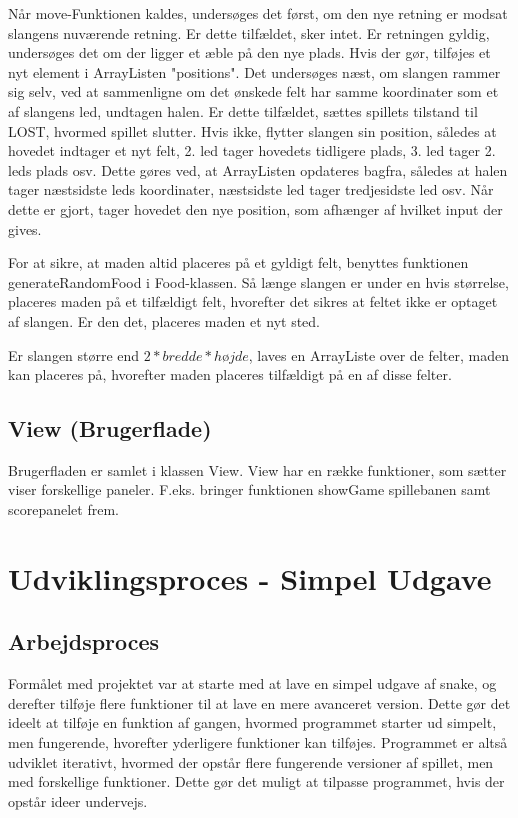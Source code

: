 \documentclass{report}
\begin{document}
Når move-Funktionen kaldes, undersøges det først, om den nye retning er modsat slangens nuværende retning. Er dette tilfældet, sker intet. Er retningen gyldig, undersøges det om der ligger et æble på den nye plads. Hvis der gør, tilføjes et nyt element i ArrayListen "positions". 
Det undersøges næst, om slangen rammer sig selv, ved at sammenligne om det ønskede felt har samme koordinater som et af slangens led, undtagen halen. Er dette tilfældet, sættes spillets tilstand til LOST, hvormed spillet slutter. Hvis ikke, flytter slangen sin position, således at hovedet indtager et nyt felt, 2. led tager hovedets tidligere plads, 3. led tager 2. leds plads osv. Dette gøres ved, at ArrayListen opdateres bagfra, således at halen tager næstsidste leds koordinater, næstsidste led tager tredjesidste led osv. Når dette er gjort, tager hovedet den nye position, som afhænger af hvilket input der gives.

For at sikre, at maden altid placeres på et gyldigt felt, benyttes funktionen generateRandomFood i Food-klassen. Så længe slangen er under en hvis størrelse, placeres maden på et tilfældigt felt, hvorefter det sikres at feltet ikke er optaget af slangen. Er den det, placeres maden et nyt sted.

Er slangen større end $2*bredde*højde$, laves en ArrayListe over de felter, maden kan placeres på, hvorefter maden placeres tilfældigt på en af disse felter.

\subsection{View (Brugerflade)}
Brugerfladen er samlet i klassen View. View har en række funktioner, som sætter viser forskellige paneler. F.eks. bringer funktionen showGame spillebanen samt scorepanelet frem. 
\section{Udviklingsproces - Simpel Udgave}
\subsection{Arbejdsproces}
Formålet med projektet var at starte med at lave en simpel udgave af snake, og derefter tilføje flere funktioner til at lave en mere avanceret version. Dette gør det ideelt at tilføje en funktion af gangen, hvormed programmet starter ud simpelt, men fungerende, hvorefter yderligere funktioner kan tilføjes. Programmet er altså udviklet iterativt, hvormed der opstår flere fungerende versioner af spillet, men med forskellige funktioner. Dette gør det muligt at tilpasse programmet, hvis der opstår ideer undervejs. 
\end{document}
